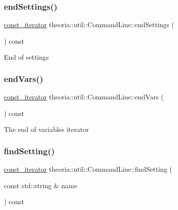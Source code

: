 \subsubsection{\texorpdfstring{end\+Settings()}{endSettings()}}
{\footnotesize\ttfamily \hyperlink{classtheoria_1_1util_1_1CommandLine_a729aa00feedd8257d4caafc73ac6ee63}{const\+\_\+iterator} theoria\+::util\+::\+Command\+Line\+::end\+Settings (\begin{DoxyParamCaption}{ }\end{DoxyParamCaption}) const\hspace{0.3cm}{\ttfamily [inline]}}

End of settings \mbox{\label{classtheoria_1_1util_1_1CommandLine_add5993c46a68548f70a75b2eb9431558}} 
\subsubsection{\texorpdfstring{end\+Vars()}{endVars()}}
{\footnotesize\ttfamily \hyperlink{classtheoria_1_1util_1_1CommandLine_a729aa00feedd8257d4caafc73ac6ee63}{const\+\_\+iterator} theoria\+::util\+::\+Command\+Line\+::end\+Vars (\begin{DoxyParamCaption}{ }\end{DoxyParamCaption}) const\hspace{0.3cm}{\ttfamily [inline]}}

The end of variables iterator \mbox{\label{classtheoria_1_1util_1_1CommandLine_abb86432416368ace970920f3fc4fe9c6}} 
\subsubsection{\texorpdfstring{find\+Setting()}{findSetting()}}
{\footnotesize\ttfamily \hyperlink{classtheoria_1_1util_1_1CommandLine_a729aa00feedd8257d4caafc73ac6ee63}{const\+\_\+iterator} theoria\+::util\+::\+Command\+Line\+::find\+Setting (\begin{DoxyParamCaption}\item[{const std\+::string \&}]{name }\end{DoxyParamCaption}) const\hspace{0.3cm}{\ttfamily [inline]}}

